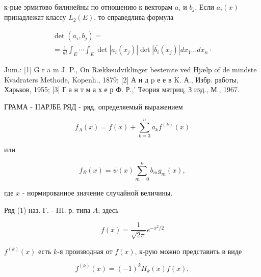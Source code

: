 \documentclass[10pt]{article}
\begin{document}
к-рые эрмитово билинейны по отношению к векторам $a_{i}$ и $b_{j}$. Если $a_{i}(x)$ принадлежат классу $L_{2}(E)$, то справедлива формула



\[

\begin{gathered}

\operatorname{det}\left(a_{i}, b_{j}\right)= \\

=\frac{1}{n !} \int_{E} \cdots \int_{E} \operatorname{det}\left|a_{i}\left(x_{j}\right)\right| \operatorname{det}\left|\overline{b_{i}}\left(x_{j}\right)\right| d x_{1} \ldots d x_{n} \cdot

\end{gathered}

\]



Jum.: [1] G r a m J. P., On Rækkeudviklinger bestemte ved Hjælp of de mindste Kvadraters Methode, Kopenh., 1879; [2] А н д p е е в K. А., Избр. работы, Харьков, 1955; [3] Г а н т м а х е р Ф. Р.,' Теория матриц, З изд., М., 1967.



ГРАМА - IIАРЈБЕ РЯД - ряд, определяемый выражением



\[

f_{A}(x)=f(x)+\sum_{k=3}^{n} a_{k} f^{(k)}(x)

\]



или



\[

f_{B}(x)=\psi(x) \sum_{m=0}^{n} b_{m} g_{m}(x),

\]



где $x$ - нормированное значение случайной величины.



Ряд (1) наз. Г. - III. р. типа $A$; здесь



\[

f(x)=\frac{1}{\sqrt{2 \pi}} e^{-x^{2} / 2}

\]



$f^{(k)}(x)$ есть $k$-я производная от $f(x)$, к-рую можно представить в виде



\[

f^{(k)}(x)=(-1)^{k} H_{k}(x) f(x),

\]
\end{document}
